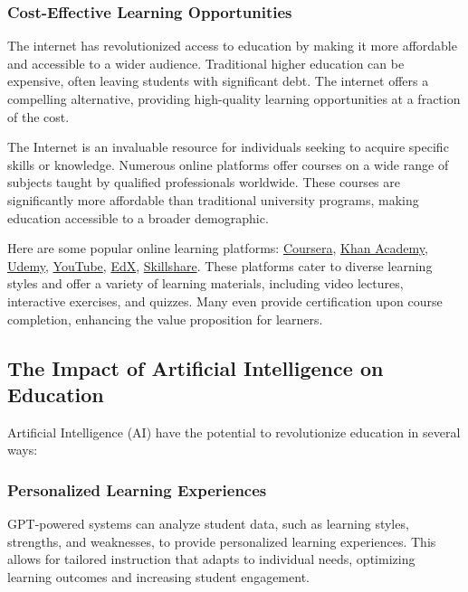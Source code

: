 \documentclass[a4paper,11pt]{article}
\begin{document}
\subsubsection{Cost-Effective Learning Opportunities}

The internet has revolutionized access to education by making it more affordable and accessible to a wider audience. Traditional higher education can be expensive, often leaving students with significant debt. The internet offers a compelling alternative, providing high-quality learning opportunities at a fraction of the cost.

The Internet is an invaluable resource for individuals seeking to acquire specific skills or knowledge. Numerous online platforms offer courses on a wide range of subjects taught by qualified professionals worldwide. These courses are significantly more affordable than traditional university programs, making education accessible to a broader demographic.

Here are some popular online learning platforms:
 \href{https://www.coursera.org/}{Coursera}, 
 \href{https://www.khanacademy.org/}{Khan Academy},
 \href{https://www.udemy.com/}{Udemy},
 \href{https://www.youtube.com/}{YouTube},
 \href{https://www.edx.org/}{EdX},
 \href{https://www.skillshare.com/}{Skillshare}. 
These platforms cater to diverse learning styles and offer a variety of learning materials, including video lectures, interactive exercises, and quizzes. Many even provide certification upon course completion, enhancing the value proposition for learners.\cite{role-internet-in-education}

\subsection{The Impact of Artificial Intelligence on Education}

Artificial Intelligence (AI) have the potential to revolutionize education in several ways: \cite{ai-in-education}

\subsubsection{Personalized Learning Experiences}

GPT-powered systems can analyze student data, such as learning styles, strengths, and weaknesses, to provide personalized learning experiences. This allows for tailored instruction that adapts to individual needs, optimizing learning outcomes and increasing student engagement.
\end{document}
